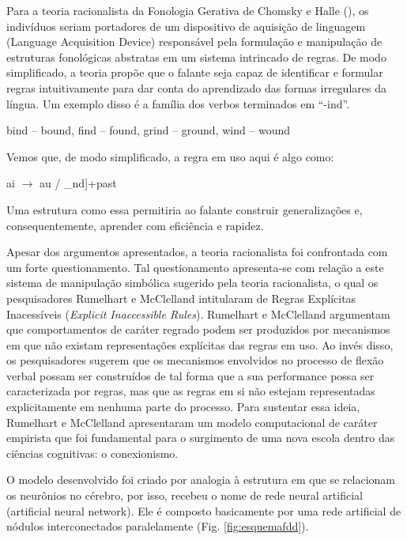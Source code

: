 Para a teoria racionalista da Fonologia Gerativa de Chomsky e Halle (\citeyear{chomsky:1968}), os indivíduos seriam portadores de um dispositivo de aquisição de linguagem (Language Acquisition Device) responsável pela formulação e manipulação de estruturas fonológicas abstratas em um sistema intrincado de regras. De modo simplificado, a teoria propõe que o falante seja capaz de identificar e formular regras intuitivamente para dar conta do aprendizado das formas irregulares da língua. Um exemplo disso é a família dos verbos terminados em “-ind”.

\begin{center}
bind – bound, find – found, grind – ground, wind – wound
\end{center}

Vemos que, de modo simplificado, a regra em uso aqui é algo como:
\begin{center}
ai $\rightarrow$ au / \_nd]+past
\end{center}

Uma estrutura como essa permitiria ao falante construir generalizações e, consequentemente, aprender com eficiência e rapidez. 

Apesar dos argumentos apresentados, a teoria racionalista foi confrontada com um forte questionamento. Tal questionamento apresenta-se com relação a este sistema de manipulação simbólica sugerido pela teoria racionalista, o qual os pesquisadores Rumelhart e McClelland intitularam de Regras Explícitas Inacessíveis (\textit{Explicit Inaccessible Rules}). Rumelhart e McClelland argumentam que comportamentos de caráter regrado podem ser produzidos por mecanismos em que não existam representações explícitas das regras em uso. Ao invés disso, os pesquisadores sugerem que os mecanismos envolvidos no processo de flexão verbal possam ser construídos de tal forma que a sua performance possa ser caracterizada por regras, mas que as regras em si não estejam representadas explicitamente em nenhuma parte do processo. Para sustentar essa ideia, Rumelhart e McClelland apresentaram um modelo computacional  de caráter empirista que foi fundamental para o surgimento de uma nova escola dentro das ciências cognitivas: o conexionismo.





O modelo desenvolvido foi criado por analogia à estrutura em que se relacionam os neurônios no cérebro, por isso, recebeu o nome de rede neural artificial (artificial neural network). Ele é composto basicamente por uma rede artificial de nódulos interconectados paralelamente (Fig. \ref{fig:esquemafdd}).

